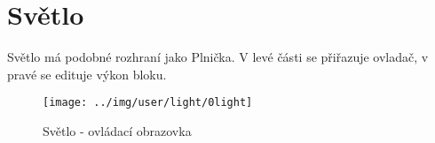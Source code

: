 
\section{Světlo}

Světlo má podobné rozhraní jako Plnička. V levé části se přiřazuje ovladač, v pravé se edituje výkon bloku.

\begin{figure}[!ht]\centering
\texttt{[image: ../img/user/light/0light]}

\caption{Světlo - ovládací obrazovka}
\label{fig:user_light_0light}

\end{figure}

\FloatBarrier
